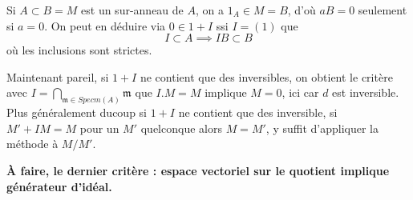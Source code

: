 \documentclass[a4paper,12pt]{book}
\newcommand{\m}{\mathfrak{m}}
\theoremstyle{plain}
\theoremstyle{definition}
\theoremstyle{remark}
\begin{document}
Si $A\subset B=M$ est un sur-anneau de $A$, on a $1_A\in M=B$,
d'où $aB=0$ seulement si $a=0$. On peut en déduire via 
$0\in1+I$ ssi $I=(1)$ que 
\[I\subset A\implies IB\subset B\]
où les inclusions sont strictes.

Maintenant pareil, si $1+I$ ne contient que des inversibles, on obtient
le critère avec $I=\bigcap_{\m\in Specm(A)} \m$ que $I.M=M$ implique
$M=0$, ici car $d$ est inversible. Plus généralement ducoup si $1+I$
ne contient que des inversible, si $M'+IM=M$ pour un $M'$ quelconque 
alors $M=M'$, y suffit d'appliquer la méthode à $M/M'$.

\textbf{À faire, le dernier critère : espace vectoriel sur le quotient
implique générateur d'idéal.}




\printbibliography
\end{document}
